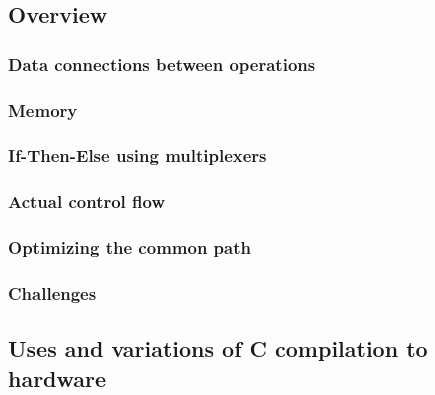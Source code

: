 \subsection{Overview}
\label{cForSpatial:overview}

\subsubsection{Data connections between operations}
\label{cForSpatial:dataConnections}

\subsubsection{Memory}
\label{cForSpatial:memory}

\subsubsection{If-Then-Else using multiplexers}
\label{cForSpatial:ifThenElse}

\subsubsection{Actual control flow}
\label{cForSpatial:actualControlFlow}

\subsubsection{Optimizing the common path}
\label{cForSpatial:optimizing}

\subsubsection{Challenges}
\label{cForSpatial:challenges}

\subsection{Uses and variations of C compilation to hardware}
\label{cForSpatial:uses}
